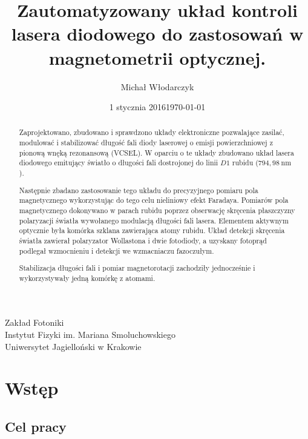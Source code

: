 \documentclass[a4paper,10pt,twoside]{report}
\date{1 stycznia 2016}
\title{Zautomatyzowany układ kontroli lasera diodowego do zastosowań w magnetometrii optycznej.}
\author{Michał Włodarczyk}
\date{\footnotesize{\today}}
\begin{document}



\maketitle
\vspace{0.25\textheight}
\begin{large}
\centering
Zakład Fotoniki\\
Instytut Fizyki im. Mariana Smoluchowskiego\\
Uniwersytet Jagielloński w Krakowie\\
\end{large}
\thispagestyle{empty}

\newpage
\tableofcontents
\thispagestyle{plain}
\setcounter{page}{1}
\newpage

\begin{abstract}
Zaprojektowano, zbudowano i sprawdzono układy elektroniczne pozwalające zasilać, modulować i stabilizować długość fali diody laserowej o emisji powierzchniowej z pionową wnęką rezonansową (VCSEL). W oparciu o te układy zbudowano układ lasera diodowego emitujący światło o długości fali dostrojonej do linii $D1$ rubidu ($794{,}98~ \mathrm{nm}$).

Następnie zbadano zastosowanie tego układu do precyzyjnego pomiaru pola magnetycznego wykorzystując do tego celu nieliniowy efekt Faradaya. Pomiarów pola magnetycznego dokonywano w parach rubidu poprzez obserwację skręcenia płaszczyzny polaryzacji światła wywołanego modulacją długości fali lasera. Elementem aktywnym optycznie była komórka szklana zawierająca atomy rubidu.  Układ detekcji skręcenia światła zawierał polaryzator Wollastona i dwie fotodiody, a uzyskany fotoprąd podlegał wzmocnieniu i detekcji we wzmacniaczu fazoczułym. 

Stabilizacja długości fali i pomiar magnetorotacji zachodziły jednocześnie i wykorzystywały jedną komórkę z atomami.
 
\end{abstract}

\chapter{Wstęp}
\section{Cel pracy}

\end{document}
